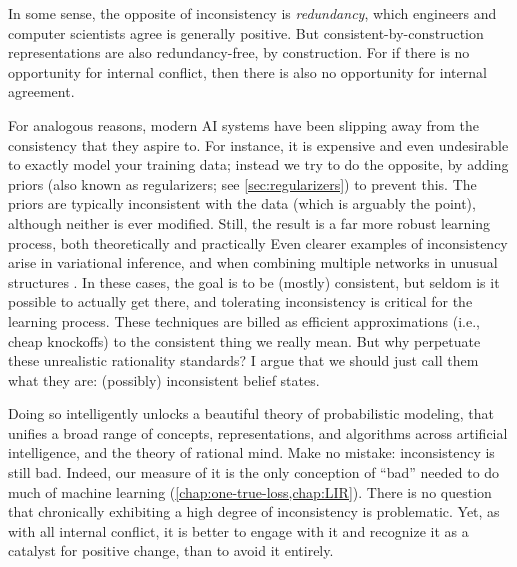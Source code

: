 
In some sense, the opposite of inconsistency is \emph{redundancy}, which engineers and computer scientists agree is generally positive. 
But consistent-by-construction representations are also redundancy-free, by construction. 
For if there is no opportunity for internal conflict, then there is also no opportunity for internal agreement. 

For analogous reasons, modern AI systems have been slipping away from the consistency that they aspire to.
For instance, it is expensive and even undesirable to exactly model your training data; instead we try to do the opposite, by adding priors (also known as regularizers; see \cref{sec:regularizers}) to prevent this.
The priors are typically inconsistent with the data (which is arguably the point), although neither is ever modified. 
Still, the result is a far more robust learning process, both theoretically \cite{ftrl} and practically \cite{regularizers}
%
Even clearer examples of inconsistency arise in variational inference, 
    and when combining multiple networks in unusual structures \cite{cyclegan,kingma2013autoencoding}.
In these cases, the goal is to be (mostly) consistent, but seldom is it possible to actually get there,
    and tolerating inconsistency is critical for the learning process.
%
These techniques are billed
as efficient approximations (i.e., cheap knockoffs) to the consistent thing we really mean.
But why perpetuate these unrealistic rationality standards?
I argue that we should just call them what they are: (possibly) inconsistent belief states.

Doing so intelligently unlocks a beautiful theory of probabilistic modeling, that unifies a broad range of concepts, representations, and algorithms across artificial intelligence, and the theory of rational mind. 
Make no mistake: inconsistency is still bad.
Indeed, our measure of it is the only conception of ``bad'' needed to do much of machine learning (\cref{chap:one-true-loss,chap:LIR}).
There is no question that chronically exhibiting a high degree of inconsistency is problematic.
%
Yet, as with all internal conflict, it is better to engage with it and recognize it as a catalyst for positive change, 
than to avoid it entirely. 

